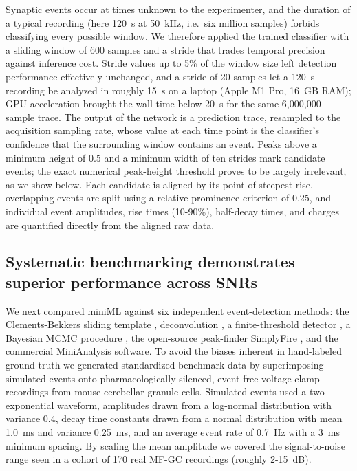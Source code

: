 \documentclass[11pt]{article}
\begin{document}
Synaptic events occur at times unknown to the experimenter, and the duration
of a typical recording (here 120~s at 50~kHz, i.e.\ six million samples)
forbids classifying every possible window. We therefore applied the trained
classifier with a sliding window of 600 samples and a stride that trades
temporal precision against inference cost. Stride values up to 5\% of the
window size left detection performance effectively unchanged, and a stride
of 20 samples let a 120~s recording be analyzed in roughly 15~s on a laptop
(Apple M1 Pro, 16~GB RAM); GPU acceleration brought the wall-time below
20~s for the same 6{,}000{,}000-sample trace. The output of the network is a
prediction trace, resampled to the acquisition sampling rate, whose value at
each time point is the classifier's confidence that the surrounding window
contains an event. Peaks above a minimum height of 0.5 and a minimum width
of ten strides mark candidate events; the exact numerical peak-height
threshold proves to be largely irrelevant, as we show below. Each candidate
is aligned by its point of steepest rise, overlapping events are split using
a relative-prominence criterion of 0.25, and individual event amplitudes,
rise times (10-90\%), half-decay times, and charges are quantified directly
from the aligned raw data.

\subsection{Systematic benchmarking demonstrates superior performance across SNRs}

We next compared miniML against six independent event-detection methods: the
Clements-Bekkers sliding template \citep{clements1997detection}, deconvolution
\citep{pernia2012deconvolution}, a finite-threshold detector
\citep{kudoh2002template}, a Bayesian MCMC procedure
\citep{merel2016bayesian}, the open-source peak-finder SimplyFire
\citep{mori2024simplyfire}, and the commercial MiniAnalysis software. To
avoid the biases inherent in hand-labeled ground truth we generated
standardized benchmark data by superimposing simulated events onto
pharmacologically silenced, event-free voltage-clamp recordings from mouse
cerebellar granule cells. Simulated events used a two-exponential waveform,
amplitudes drawn from a log-normal distribution with variance 0.4, decay time
constants drawn from a normal distribution with mean 1.0~ms and variance
0.25~ms, and an average event rate of 0.7~Hz with a 3~ms minimum spacing. By
scaling the mean amplitude we covered the signal-to-noise range seen in a
cohort of 170 real MF-GC recordings (roughly 2-15~dB).
\end{document}
